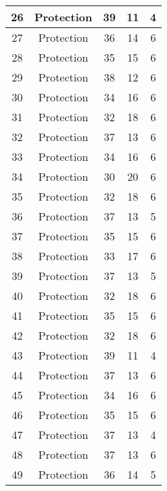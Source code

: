 \documentclass[results.tex]{subfiles}
\begin{document}
\begin{center}
\begin{tabular}{| c || c | c | c | c |}
    \hline
    26 & Protection & 39 & 11 & 4 \\ 
    \hline
    27 & Protection & 36 & 14 & 6 \\ 
    \hline
    28 & Protection & 35 & 15 & 6 \\ 
    \hline
    29 & Protection & 38 & 12 & 6 \\ 
    \hline
    30 & Protection & 34 & 16 & 6 \\ 
    \hline
    31 & Protection & 32 & 18 & 6 \\ 
    \hline
    32 & Protection & 37 & 13 & 6 \\ 
    \hline
    33 & Protection & 34 & 16 & 6 \\ 
    \hline
    34 & Protection & 30 & 20 & 6 \\ 
    \hline
    35 & Protection & 32 & 18 & 6 \\ 
    \hline
    36 & Protection & 37 & 13 & 5 \\ 
    \hline
    37 & Protection & 35 & 15 & 6 \\ 
    \hline
    38 & Protection & 33 & 17 & 6 \\ 
    \hline
    39 & Protection & 37 & 13 & 5 \\ 
    \hline
    40 & Protection & 32 & 18 & 6 \\ 
    \hline
    41 & Protection & 35 & 15 & 6 \\ 
    \hline
    42 & Protection & 32 & 18 & 6 \\ 
    \hline
    43 & Protection & 39 & 11 & 4 \\ 
    \hline
    44 & Protection & 37 & 13 & 6 \\ 
    \hline
    45 & Protection & 34 & 16 & 6 \\ 
    \hline
    46 & Protection & 35 & 15 & 6 \\ 
    \hline
    47 & Protection & 37 & 13 & 4 \\ 
    \hline
    48 & Protection & 37 & 13 & 6 \\ 
    \hline
    49 & Protection & 36 & 14 & 5 \\ 
    \hline   \end{tabular}
\end{center}
\end{document}
